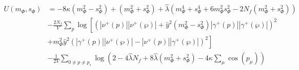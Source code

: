 \begin{align}\label{eq:improved_zeroOrderPot}
 U(m_{\Phi}, s_{\Phi}) &= -8 \kappa \left( m_{\Phi}^2 - s_{\Phi}^2 \right)   +   \left( m_{\Phi}^2 + s_{\Phi}^2 \right)
                         + \hat\lambda \left( m_{\Phi}^4 + s_{\Phi}^4 + 6 m_{\Phi}^2 s_{\Phi}^2 - 2 N_f \left(m_{\Phi}^2 + s_{\Phi}^2 \right) \right) 
                           \nonumber \\
                        & -\frac{2N_f}{V} \sum\limits_p \log
                                    \left[ \left( |\nu^+(p)| |\nu^+(\wp)|   +
                                    \hat y ^2 \left( m_{\Phi}^2 - s_{\Phi}^2 \right) |\gamma^+(p)| |\gamma^+(\wp)|\right)^2 
                                    \nonumber \right. \\ 
                        & \left. +  m_{\Phi}^2 \hat y^2 \left( |\gamma^+(p)| |\nu^+(\wp)|   -   |\nu^+(p)| |\gamma^+(\wp)| \right)^2\right]
                        \nonumber \\
                        & - \frac{1}{2V}\sum\limits_{0 \neq p \neq p_s} 
          \log\left( 2 - 4 \hat\lambda N_f + 8 \hat\lambda \left( m_{\Phi}^2 + s_{\Phi}^2  \right) - 4 \kappa \sum_{\mu} \cos(p_{\mu}) \right)
\end{align}

